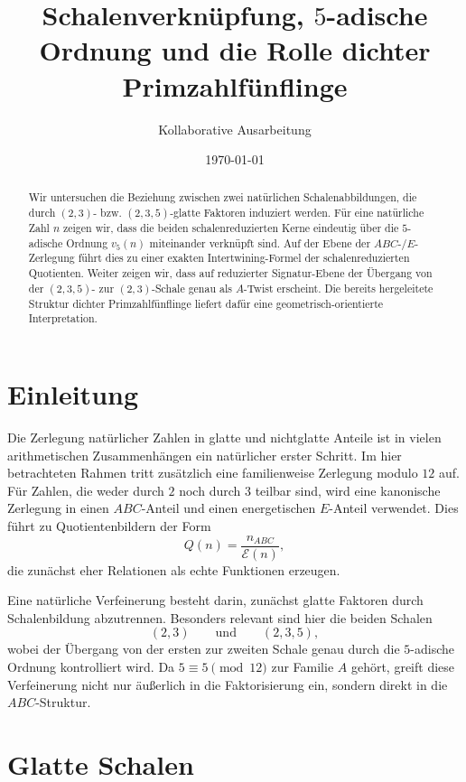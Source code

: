 \documentclass[11pt,a4paper]{article}
\title{Schalenverknüpfung, \(5\)-adische Ordnung und die Rolle dichter Primzahlfünflinge}
\author{Kollaborative Ausarbeitung}
\date{\today}
\theoremstyle{definition}
\theoremstyle{remark}
\begin{document}
	\maketitle
	
	\begin{abstract}
		Wir untersuchen die Beziehung zwischen zwei natürlichen Schalenabbildungen, die durch
		\((2,3)\)- bzw. \((2,3,5)\)-glatte Faktoren induziert werden. Für eine natürliche Zahl \(n\)
		zeigen wir, dass die beiden schalenreduzierten Kerne eindeutig über die \(5\)-adische Ordnung
		\(v_5(n)\) miteinander verknüpft sind. Auf der Ebene der \(ABC\)-/\(E\)-Zerlegung führt dies zu
		einer exakten Intertwining-Formel der schalenreduzierten Quotienten. Weiter zeigen wir, dass auf
		reduzierter Signatur-Ebene der Übergang von der \((2,3,5)\)- zur \((2,3)\)-Schale genau als
		\(A\)-Twist erscheint. Die bereits hergeleitete Struktur dichter Primzahlfünflinge liefert dafür
		eine geometrisch-orientierte Interpretation.
	\end{abstract}
	
	\section{Einleitung}
	
	Die Zerlegung natürlicher Zahlen in glatte und nichtglatte Anteile ist in vielen arithmetischen
	Zusammenhängen ein natürlicher erster Schritt. Im hier betrachteten Rahmen tritt zusätzlich eine
	familienweise Zerlegung modulo \(12\) auf. Für Zahlen, die weder durch \(2\) noch durch \(3\)
	teilbar sind, wird eine kanonische Zerlegung in einen \(ABC\)-Anteil und einen energetischen
	\(E\)-Anteil verwendet. Dies führt zu Quotientenbildern der Form
	\[
	Q(n)=\frac{n_{ABC}}{\mathcal E(n)},
	\]
	die zunächst eher Relationen als echte Funktionen erzeugen.
	
	Eine natürliche Verfeinerung besteht darin, zunächst glatte Faktoren durch Schalenbildung
	abzutrennen. Besonders relevant sind hier die beiden Schalen
	\[
	(2,3)\qquad\text{und}\qquad (2,3,5),
	\]
	wobei der Übergang von der ersten zur zweiten Schale genau durch die \(5\)-adische Ordnung
	kontrolliert wird. Da \(5\equiv 5\pmod{12}\) zur Familie \(A\) gehört, greift diese Verfeinerung
	nicht nur äußerlich in die Faktorisierung ein, sondern direkt in die \(ABC\)-Struktur.
	
	\section{Glatte Schalen}
	
\end{document}
